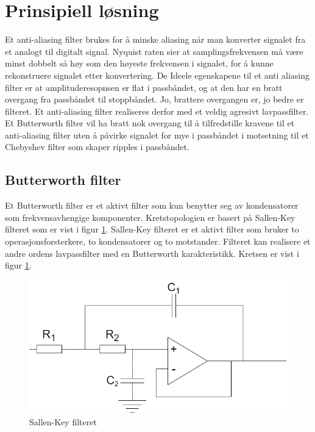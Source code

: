 \newpage
\section{Prinsipiell løsning}
\label{prinsipiellLoesning}

Et anti-aliasing filter brukes for å minske aliasing når man konverter signalet fra et analogt til digitalt signal. Nyquist raten sier at samplingsfrekvensen må være minst dobbelt så høy som den høyeste frekvensen i signalet, for å kunne rekonstruere signalet etter konvertering\cite{Nyquist}. De Ideele egenskapene til et anti aliasing filter er at amplituderesopnsen er flat i passbåndet, og at den har en bratt overgang fra passbåndet til stoppbåndet. Jo, brattere overgangen er, jo bedre er filteret. Et anti-aliasing filter realiseres derfor med et veldig agresivt lavpassfilter. Et Butterworth filter vil ha bratt nok overgang til å tilfredstille kravene til et anti-aliasing filter uten å påvirke signalet for mye i passbåndet i motsetning til et Chebyshev filter som skaper ripples i passbåndet.

\subsection{Butterworth filter}
\label{ButterworthFilter}

Et Butterworth filter er et aktivt filter som kun benytter seg av kondensatorer som frekvensavhengige komponenter. Kretstopologien er basert på Sallen-Key filteret som er vist i figur \ref{fig:SallenKey}. Sallen-Key filteret er et aktivt filter som bruker to operasjonsforsterkere, to kondensatorer og to motstander\cite{SallenKey}. Filteret kan realisere et andre ordens lavpassfilter med en Butterworth karakteristikk. Kretsen er vist i figur \ref{fig:SallenKey}. 

\begin{figure} [!h]
\centering
\includegraphics[width=0.7\linewidth]{Bilder/SallenKey.drawio.png}
\caption{Sallen-Key filteret}
\label{fig:SallenKey}
\end{figure}

